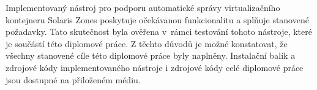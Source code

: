 Implementovaný nástroj pro podporu automatické správy virtualizačního
kontejneru Solaris Zones poskytuje očekávanou funkcionalitu a splňuje stanovené požadavky. Tato skutečnost byla ověřena v~rámci testování
tohoto nástroje, které je součástí této diplomové práce. Z těchto důvodů je možné konstatovat, že všechny stanovené cíle této diplomové práce 
byly naplněny. Instalační balík a zdrojové kódy implementovaného nástroje i zdrojové kódy celé diplomové práce jsou dostupné na přiloženém médiu.